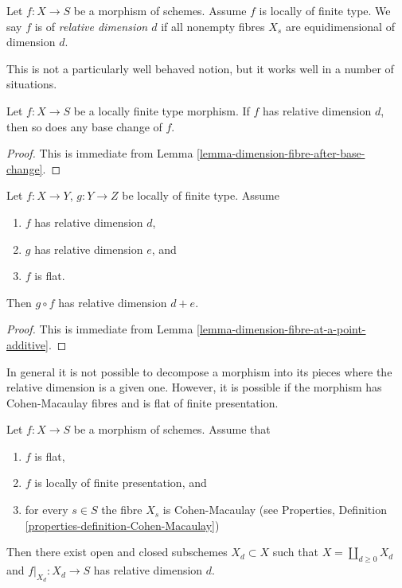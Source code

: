 \begin{definition}
\label{definition-relative-dimension-d}
Let $f : X \to S$ be a morphism of schemes.
Assume $f$ is locally of finite type.
We say $f$ is of {\it relative dimension $d$} if
all nonempty fibres $X_s$ are equidimensional of dimension $d$.
\end{definition}

\noindent
This is not a particularly well behaved notion, but it works well
in a number of situations.

\begin{lemma}
\label{lemma-base-change-relative-dimension-d}
Let $f : X \to S$ be a locally finite type morphism.
If $f$ has relative dimension $d$, then so does any base
change of $f$.
\end{lemma}

\begin{proof}
This is immediate from
Lemma \ref{lemma-dimension-fibre-after-base-change}.
\end{proof}

\begin{lemma}
\label{lemma-composition-relative-dimension-d}
Let $f : X \to Y$, $g : Y \to Z$ be locally of finite type.
Assume
\begin{enumerate}
\item $f$ has relative dimension $d$,
\item $g$ has relative dimension $e$, and
\item $f$ is flat.
\end{enumerate}
Then $g \circ f$ has relative dimension $d + e$.
\end{lemma}

\begin{proof}
This is immediate from Lemma \ref{lemma-dimension-fibre-at-a-point-additive}.
\end{proof}

\noindent
In general it is not possible to decompose a morphism
into its pieces where the relative dimension is a given
one. However, it is possible if the morphism has Cohen-Macaulay
fibres and is flat of finite presentation.

\begin{lemma}
\label{lemma-flat-finite-presentation-CM-fibres-relative-dimension}
Let $f : X \to S$ be a morphism of schemes.
Assume that
\begin{enumerate}
\item $f$ is flat,
\item $f$ is locally of finite presentation, and
\item for every $s \in S$ the fibre $X_s$ is Cohen-Macaulay
(see Properties, Definition \ref{properties-definition-Cohen-Macaulay})
\end{enumerate}
Then there exist open and closed subschemes $X_d \subset X$
such that $X = \coprod_{d \geq 0} X_d$ and $f|_{X_d} : X_d \to S$
has relative dimension $d$.
\end{lemma}

